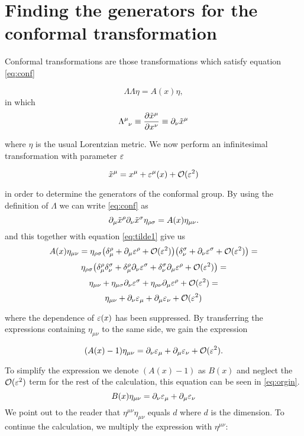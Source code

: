 \section{Finding the generators for the conformal transformation \label{sec:app1}}
Conformal transformations are those transformations which satisfy equation \ref{eq:conf}

\begin{equation}
\Lambda\Lambda\eta = A(x)\eta,
\label{eq:conf}
\end{equation}
in which 
$$\Lambda\ein{\mu}{\nu} \equiv \pder{\tilde{x}^\mu}{x^\nu}\equiv
\p_\nu \tilde{x}^\mu $$

where $\eta$ is the usual Lorentzian metric. We now perform an infinitesimal transformation with parameter $\varepsilon$

\begin{equation}
\tilde{x} ^\mu =x^\mu+\varepsilon^\mu (x)+ \mathcal{O}(\varepsilon^2)
\label{eq:tilde1}
\end{equation}

in order to determine the generators of the conformal group. By using the definition of $\Lambda$ we can write \ref{eq:conf} as
$$
\partial _\mu \tilde{x}^\rho \partial_\nu \tilde{x}^\sigma 
\eta_{\rho \sigma}
=A(x) \eta_{\mu \nu}. 
$$
and this together with equation \ref{eq:tilde1} give us 
$$
A(x) \eta_{\mu \nu}=
\eta_{\rho \sigma}
\big(\delta^\rho _\mu 
+ \partial_\mu \varepsilon ^\rho
+\mathcal{O}(\varepsilon^2)\big)
\big(\delta^\sigma _\nu 
+ \partial_\nu \varepsilon ^\sigma
+\mathcal{O}(\varepsilon^2)\big)=
$$$$
\eta_{\rho \sigma} 
\big(\delta^\rho _\mu \delta^\sigma _\nu
+\delta^\rho _\mu \partial_\nu \varepsilon ^\sigma
+\delta^\sigma _\nu\partial_\mu \varepsilon ^\rho
+\mathcal{O}(\varepsilon^2)\big)=
$$$$
\eta_{\mu \nu}
+\eta_{\mu \sigma}\partial_\nu \varepsilon ^\sigma
+\eta_{\rho \nu}\partial_\mu \varepsilon ^\rho
+\mathcal{O}(\varepsilon^2)=
$$$$
\eta_{\mu \nu}
+\partial_\nu \varepsilon _\mu
+\partial_\mu \varepsilon _\nu
+\mathcal{O}(\varepsilon^2)
$$

where the dependence of $\varepsilon(x)$ has been suppressed. By transferring the expressions containing $\eta_{\mu \nu}$ to the same side, we gain the expression

$$
(A(x)-1)\eta_{\mu \nu}
=
\partial_\nu \varepsilon _\mu
+\partial_\mu \varepsilon _\nu
+\mathcal{O}(\varepsilon^2).
$$

To simplify the expression we denote $(A(x)-1)$ as $B(x)$ and neglect the $\mathcal{O}(\varepsilon^2)$ term for the rest of the calculation, this equation can be seen in \ref{eq:orgin}.
\begin{equation}
B(x)\eta_{\mu \nu}=
\partial_\nu \varepsilon _\mu
+\partial_\mu \varepsilon _\nu
\label{eq:orgin}
\end{equation}
We point out to the reader that $\eta^{\mu \nu} \eta_{\mu \nu}$ equals $d$ where $d$ is the dimension. 
To continue the calculation, we multiply the expression with $\eta^{\mu \nu}$:

